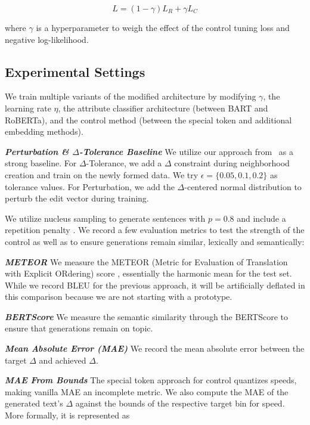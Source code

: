 \begin{equation}
    L = (1-\gamma) L_R + \gamma L_C
\end{equation}

where $\gamma$ is a hyperparameter to weigh the effect of the control tuning loss and negative log-likelihood. 

\subsection{Experimental Settings}
\label{subsec:ac_experimental}

We train multiple variants of the modified architecture by modifying $\gamma$, the learning rate $\eta$, the attribute classifier architecture (\ie between BART and RoBERTa), and the control method (\ie between the special token and additional embedding methods). 

\textit{\textbf{Perturbation \& $\Delta$-Tolerance Baseline}} We utilize our approach from~ as a strong baseline. For $\Delta$-Tolerance, we add a $\Delta$ constraint during neighborhood creation and train on the newly formed data. We try $\epsilon = \{0.05, 0.1, 0.2\}$ as tolerance values. For Perturbation, we add the $\Delta$-centered normal distribution to perturb the edit vector during training.

We utilize nucleus sampling to generate sentences with $p=0.8$ and include a repetition penalty \citep{keskar2019ctrl}. We record a few evaluation metrics to test the strength of the control as well as to ensure generations remain similar, lexically and semantically:

\textit{\textbf{METEOR}} We measure the METEOR (Metric for Evaluation of Translation with Explicit ORdering) score \citep{lavie-agarwal-2007-meteor}, essentially the harmonic mean for the test set. While we record BLEU for the previous approach, it will be artificially deflated in this comparison because we are not starting with a prototype. 

\textit{\textbf{BERTScore}} We measure the semantic similarity through the BERTScore \citep{zhang2019bertscore} to ensure that generations remain on topic.

\textit{\textbf{Mean Absolute Error (MAE)}} We record the mean absolute error between the target $\Delta$ and achieved $\Delta$.

\textit{\textbf{MAE From Bounds}} The special token approach for control quantizes speeds, making vanilla MAE an incomplete metric. We also compute the MAE of the generated text's $\Delta$ against the bounds of the respective target bin for speed. More formally, it is represented as 

